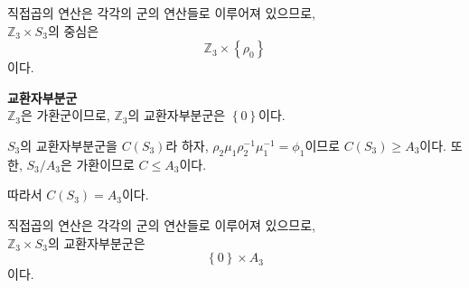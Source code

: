 \documentclass{article}
\begin{document}
직접곱의 연산은 각각의 군의 연산들로 이루어져 있으므로, 
\\$\mathbb{Z}_3 \times S_3$의 중심은
$$\mathbb{Z}_3 \times \left\{\rho_0 \right\}$$
이다.

\textbf{교환자부분군}
\\$\mathbb{Z}_3$은 가환군이므로, $\mathbb{Z}_3$의 교환자부분군은 $\left\{0\right\}$이다.

$S_3$의 교환자부분군을 $C(S_3)$라 하자, $\rho_2 \mu_1 \rho_2 ^{-1} \mu_1 ^{-1} = \phi_1$이므로 $C(S_3) \ge A_3$이다. 또한, $S_3 / A_3$은 가환이므로 $C \le A_3$이다.

따라서 $C(S_3) = A_3$이다.

직접곱의 연산은 각각의 군의 연산들로 이루어져 있으므로, 
\\$\mathbb{Z}_3 \times S_3$의 교환자부분군은
$$ \left\{0 \right\} \times A_3$$
이다.
\end{document}
